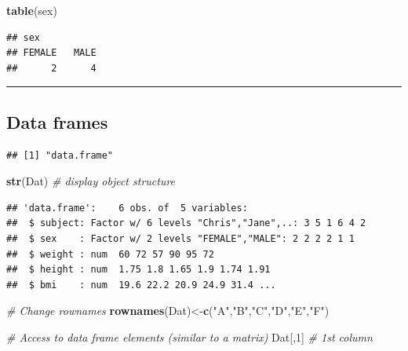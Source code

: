 \documentclass[]{article}
\newenvironment{Shaded}{\begin{snugshade}}{\end{snugshade}}
\newcommand{\KeywordTok}[1]{\textcolor[rgb]{0.13,0.29,0.53}{\textbf{{#1}}}}
\newcommand{\DecValTok}[1]{\textcolor[rgb]{0.00,0.00,0.81}{{#1}}}
\newcommand{\StringTok}[1]{\textcolor[rgb]{0.31,0.60,0.02}{{#1}}}
\newcommand{\CommentTok}[1]{\textcolor[rgb]{0.56,0.35,0.01}{\textit{{#1}}}}
\newcommand{\NormalTok}[1]{{#1}}
\numberwithin{equation}{section}
\begin{document}
\begin{Shaded}
\begin{Highlighting}[]
\KeywordTok{table}\NormalTok{(sex)}
\end{Highlighting}
\end{Shaded}

\begin{verbatim}
## sex
## FEMALE   MALE 
##      2      4
\end{verbatim}

\begin{center}\rule{0.5\linewidth}{\linethickness}\end{center}

\subsection{Data frames}\label{data-frames}

\begin{Shaded}
\end{Shaded}

\begin{verbatim}
## [1] "data.frame"
\end{verbatim}

\begin{Shaded}
\begin{Highlighting}[]
\KeywordTok{str}\NormalTok{(Dat) }\CommentTok{# display object structure}
\end{Highlighting}
\end{Shaded}

\begin{verbatim}
## 'data.frame':    6 obs. of  5 variables:
##  $ subject: Factor w/ 6 levels "Chris","Jane",..: 3 5 1 6 4 2
##  $ sex    : Factor w/ 2 levels "FEMALE","MALE": 2 2 2 2 1 1
##  $ weight : num  60 72 57 90 95 72
##  $ height : num  1.75 1.8 1.65 1.9 1.74 1.91
##  $ bmi    : num  19.6 22.2 20.9 24.9 31.4 ...
\end{verbatim}

\begin{Shaded}
\begin{Highlighting}[]
\CommentTok{# Change rownames}
\KeywordTok{rownames}\NormalTok{(Dat)<-}\KeywordTok{c}\NormalTok{(}\StringTok{"A"}\NormalTok{,}\StringTok{"B"}\NormalTok{,}\StringTok{"C"}\NormalTok{,}\StringTok{"D"}\NormalTok{,}\StringTok{"E"}\NormalTok{,}\StringTok{"F"}\NormalTok{)}

\CommentTok{# Access to data frame elements (similar to a matrix)}
\NormalTok{Dat[,}\DecValTok{1}\NormalTok{]     }\CommentTok{# 1st column}
\end{Highlighting}
\end{Shaded}
\end{document}
